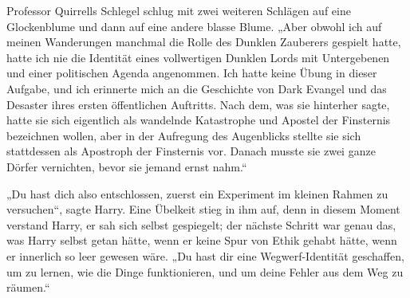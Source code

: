 Professor Quirrells Schlegel schlug mit zwei weiteren Schlägen auf eine Glockenblume und dann auf eine andere blasse Blume.
„Aber obwohl ich auf meinen Wanderungen manchmal die Rolle des Dunklen Zauberers gespielt hatte, hatte ich nie die Identität eines vollwertigen Dunklen Lords mit Untergebenen und einer politischen Agenda angenommen. Ich hatte keine Übung in dieser Aufgabe, und ich erinnerte mich an die Geschichte von Dark Evangel und das Desaster ihres ersten öffentlichen Auftritts. Nach dem, was sie hinterher sagte, hatte sie sich eigentlich als wandelnde Katastrophe und Apostel der Finsternis bezeichnen wollen, aber in der Aufregung des Augenblicks stellte sie sich stattdessen als Apostroph der Finsternis vor. Danach musste sie zwei ganze Dörfer vernichten, bevor sie jemand ernst nahm.“

„Du hast dich also entschlossen, zuerst ein Experiment im kleinen Rahmen zu versuchen“, sagte Harry.
Eine Übelkeit stieg in ihm auf, denn in diesem Moment verstand Harry, er sah sich selbst gespiegelt; der nächste Schritt war genau das, was Harry selbst getan hätte, wenn er keine Spur von Ethik gehabt hätte, wenn er innerlich so leer gewesen wäre.
„Du hast dir eine Wegwerf-Identität geschaffen, um zu lernen, wie die Dinge funktionieren, und um deine Fehler aus dem Weg zu räumen.“

